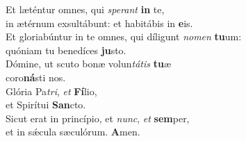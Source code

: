 \oddverse Et læténtur omnes, qui \textit{spe}\textit{rant} \textbf{in} te,~\*\\
\oddverse in ætérnum exsultábunt: et habitábis in \textbf{e}is.\\
\evenverse Et gloriabúntur in te omnes, qui díligunt \textit{no}\textit{men} \textbf{tu}um:~\*\\
\evenverse quóniam tu benedíces \textbf{ju}sto.\\
\oddverse Dómine, ut scuto bonæ volun\textit{tá}\textit{tis} \textbf{tu}æ~\*\\
\oddverse coro\textbf{ná}sti nos.\\
\evenverse Glória Pa\textit{tri}, \textit{et} \textbf{Fí}lio,~\*\\
\evenverse et Spirítui \textbf{San}cto.\\
\oddverse Sicut erat in princípio, et \textit{nunc}, \textit{et} \textbf{sem}per,~\*\\
\oddverse et in sǽcula sæculórum. \textbf{A}men.\\
